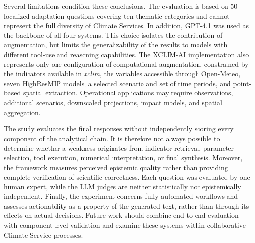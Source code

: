 Several limitations condition these conclusions. The evaluation is based on 50 localized adaptation questions covering ten thematic categories and cannot represent the full diversity of Climate Services. In addition, GPT-4.1 was used as the backbone of all four systems. This choice isolates the contribution of augmentation, but limits the generalizability of the results to models with different tool-use and reasoning capabilities. The XCLIM-AI implementation also represents only one configuration of computational augmentation, constrained by the indicators available in \emph{xclim}, the variables accessible through Open-Meteo, seven HighResMIP models, a selected scenario and set of time periods, and point-based spatial extraction. Operational applications may require observations, additional scenarios, downscaled projections, impact models, and spatial aggregation.

The study evaluates the final responses without independently scoring every component of the analytical chain. It is therefore not always possible to determine whether a weakness originates from indicator retrieval, parameter selection, tool execution, numerical interpretation, or final synthesis. Moreover, the framework measures perceived epistemic quality rather than providing complete verification of scientific correctness. Each question was evaluated by one human expert, while the LLM judges are neither statistically nor epistemically independent. Finally, the experiment concerns fully automated workflows and assesses actionability as a property of the generated text, rather than through its effects on actual decisions. Future work should combine end-to-end evaluation with component-level validation and examine these systems within collaborative Climate Service processes.